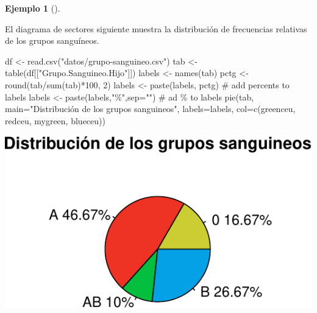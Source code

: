 \documentclass[
  a4paper,
]{scrreport}
\newenvironment{Shaded}{\begin{snugshade}}{\end{snugshade}}
\newcommand{\AttributeTok}[1]{\textcolor[rgb]{0.40,0.45,0.13}{#1}}
\newcommand{\CommentTok}[1]{\textcolor[rgb]{0.37,0.37,0.37}{#1}}
\newcommand{\DecValTok}[1]{\textcolor[rgb]{0.68,0.00,0.00}{#1}}
\newcommand{\FunctionTok}[1]{\textcolor[rgb]{0.28,0.35,0.67}{#1}}
\newcommand{\NormalTok}[1]{\textcolor[rgb]{0.00,0.23,0.31}{#1}}
\newcommand{\OtherTok}[1]{\textcolor[rgb]{0.00,0.23,0.31}{#1}}
\newcommand{\SpecialCharTok}[1]{\textcolor[rgb]{0.37,0.37,0.37}{#1}}
\newcommand{\StringTok}[1]{\textcolor[rgb]{0.13,0.47,0.30}{#1}}
\theoremstyle{plain}
\theoremstyle{definition}
\newtheorem{example}{Ejemplo}[chapter]
\theoremstyle{definition}
\theoremstyle{remark}
\begin{document}
\begin{example}[]\protect\hypertarget{exm-diagrama-sectores}{}\label{exm-diagrama-sectores}

El diagrama de sectores siguiente muestra la distribución de frecuencias
relativas de los grupos sanguíneos.

\begin{Shaded}
\begin{Highlighting}[]
\NormalTok{df }\OtherTok{\textless{}{-}} \FunctionTok{read.csv}\NormalTok{(}\StringTok{"datos/grupo{-}sanguineo.csv"}\NormalTok{)}
\NormalTok{tab }\OtherTok{\textless{}{-}} \FunctionTok{table}\NormalTok{(df[[}\StringTok{"Grupo.Sanguineo.Hijo"}\NormalTok{]])}
\NormalTok{labels }\OtherTok{\textless{}{-}} \FunctionTok{names}\NormalTok{(tab)}
\NormalTok{pctg }\OtherTok{\textless{}{-}} \FunctionTok{round}\NormalTok{(tab}\SpecialCharTok{/}\FunctionTok{sum}\NormalTok{(tab)}\SpecialCharTok{*}\DecValTok{100}\NormalTok{, }\DecValTok{2}\NormalTok{)}
\NormalTok{labels }\OtherTok{\textless{}{-}} \FunctionTok{paste}\NormalTok{(labels, pctg) }\CommentTok{\# add percents to labels }
\NormalTok{labels }\OtherTok{\textless{}{-}} \FunctionTok{paste}\NormalTok{(labels,}\StringTok{"\%"}\NormalTok{,}\AttributeTok{sep=}\StringTok{""}\NormalTok{) }\CommentTok{\# ad \% to labels }
\FunctionTok{pie}\NormalTok{(tab, }\AttributeTok{main=}\StringTok{"Distribución de los grupos sanguineos"}\NormalTok{, }\AttributeTok{labels=}\NormalTok{labels, }\AttributeTok{col=}\FunctionTok{c}\NormalTok{(greenceu, redceu, mygreen, blueceu))}
\end{Highlighting}
\end{Shaded}

\includegraphics{02-estadistica-descriptiva_files/figure-pdf/diagrama-sectores-1.pdf}

\end{example}
\end{document}
